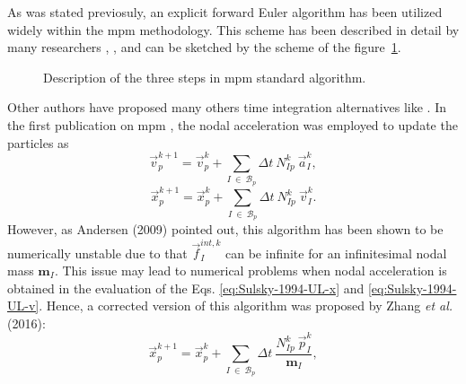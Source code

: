 \documentclass[preprint,12pt,a4paper]{elsarticle}
\newcommand{\tens}[1]{
  \ensuremath{\mathbf{{#1}}}
}
\begin{document}
As was stated previosuly, an explicit forward Euler algorithm has been utilized widely within the \acrshort{mpm} methodology. This scheme has been described in detail by many researchers
\cite{Sulsky1994}, \cite{Bardenhagen2002}, \cite{thesis_Andersen_2009} and can be sketched by the scheme of the figure~\ref{fig:MPM_algorithm}.
\begin{figure}
  \centering
  \caption{Description of the three steps in \acrshort{mpm} standard algorithm.}
  \label{fig:MPM_algorithm}
\end{figure}
Other authors have proposed many others time integration alternatives
like \cite{Guilkey_2003,Charlton_2017,Tran2019e}. In the
first publication on \acrshort{mpm} \cite{Sulsky1994}, the nodal acceleration
was employed to update the particles as
\begin{equation}
  \label{eq:Sulsky-1994-UL-v}
  \vec{v}_p^{k+1} = \vec{v}_p^{k} + \sum_{I\ \in\ \mathcal{B}_p} \Delta t\ N_{Ip}^{k}\ \vec{a}_{I}^{k},
\end{equation}
\begin{equation}
  \label{eq:Sulsky-1994-UL-x}
  \vec{x}_p^{k+1} = \vec{x}_p^{k} + \sum_{I\ \in\ \mathcal{B}_p} \Delta t\ N_{Ip}^{k}\ \vec{v}_{I}^{k}.
\end{equation}
However, as Andersen (2009)\cite{thesis_Andersen_2009} pointed out, this algorithm has been shown to be numerically unstable due to that
$\vec{f}_I^{int,k}$ can be infinite for an infinitesimal nodal mass
$\tens{m}_I$. This issue may lead to numerical problems when nodal acceleration
is obtained in the evaluation of the Eqs. \eqref{eq:Sulsky-1994-UL-x} and \eqref{eq:Sulsky-1994-UL-v}. Hence, a
corrected version of this algorithm was proposed by Zhang {\it et al.}
(2016)\cite{Zhang_book_2016}:
\begin{equation}
  \label{eq:Zhang-2016-UL-x}
  \vec{x}_p^{k+1} = \vec{x}_p^{k} + \sum_{I\ \in\ \mathcal{B}_p} \Delta t\ \frac{N_{Ip}^{k}\ \vec{p}_{I}^{k}}{\tens{m}_I}, 
\end{equation}
\end{document}
